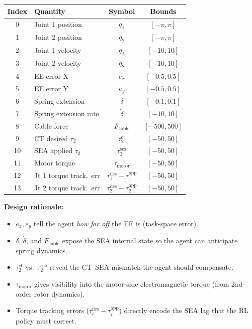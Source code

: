 \documentclass[11pt, a4paper]{article}
\begin{document}
\begin{center}
\renewcommand{\arraystretch}{1.15}
\begin{tabular}{clcc}
\toprule
\textbf{Index} & \textbf{Quantity} & \textbf{Symbol} & \textbf{Bounds} \\
\midrule
0  & Joint 1 position        & $q_1$                          & $[-\pi, \pi]$ \\
1  & Joint 2 position        & $q_2$                          & $[-\pi, \pi]$ \\
2  & Joint 1 velocity        & $\dot{q}_1$                    & $[-10, 10]$ \\
3  & Joint 2 velocity        & $\dot{q}_2$                    & $[-10, 10]$ \\
4  & EE error X              & $e_x$                          & $[-0.5, 0.5]$ \\
5  & EE error Y              & $e_y$                          & $[-0.5, 0.5]$ \\
6  & Spring extension        & $\delta$                       & $[-0.1, 0.1]$ \\
7  & Spring extension rate   & $\dot{\delta}$                 & $[-10, 10]$ \\
8  & Cable force             & $F_{\text{cable}}$             & $[-500, 500]$ \\
9  & CT desired $\tau_2$     & $\tau_2^{\text{ct}}$           & $[-50, 50]$ \\
10 & SEA applied $\tau_2$    & $\tau_2^{\text{sea}}$          & $[-50, 50]$ \\
11 & Motor torque            & $\tau_{\text{motor}}$          & $[-50, 50]$ \\
12 & Jt 1 torque track.~err  & $\tau_1^{\text{des}} - \tau_1^{\text{app}}$ & $[-50, 50]$ \\
13 & Jt 2 torque track.~err  & $\tau_2^{\text{des}} - \tau_2^{\text{app}}$ & $[-50, 50]$ \\
\bottomrule
\end{tabular}
\end{center}

\textbf{Design rationale:}
\begin{itemize}[nosep]
  \item $e_x, e_y$ tell the agent \emph{how far off} the EE is (task-space error).
  \item $\delta$, $\dot{\delta}$, and $F_{\text{cable}}$ expose the SEA internal
        state so the agent can anticipate spring dynamics.
  \item $\tau_2^{\text{ct}}$ vs.~$\tau_2^{\text{sea}}$ reveal the CT--SEA
        mismatch the agent should compensate.
  \item $\tau_{\text{motor}}$ gives visibility into the motor-side
        electromagnetic torque (from 2nd-order rotor dynamics).
  \item Torque tracking errors ($\tau_i^{\text{des}} - \tau_i^{\text{app}}$)
        directly encode the SEA lag that the RL policy must correct.
\end{itemize}
\end{document}
